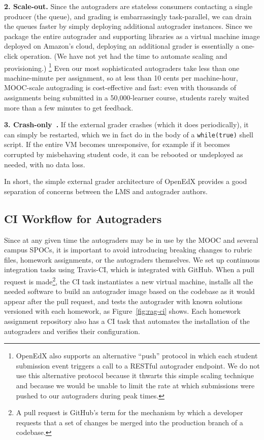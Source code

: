 \noindent\textbf{2. Scale-out.} 
Since the autograders are stateless consumers
contacting a single producer (the queue), and grading is
embarrassingly task-parallel, we can drain the queues faster by simply
deploying additional autograder instances.
Since we package the entire autograder and supporting libraries as a
virtual machine image deployed on Amazon's cloud, deploying an
additional grader is essentially a one-click operation. (We have not
yet had the time to automate scaling and provisioning.)
\footnote{OpenEdX also supports an alternative ``push'' protocol in which each student
submission event triggers a call to a RESTful autograder endpoint.
We do not use this
alternative protocol because it thwarts this simple scaling technique
and because we would be  unable to limit the rate at which
submissions were pushed to our autograders during peak times.}
Even our most sophisticated autograders take less than one
machine-minute per assignment, so at less than 10 cents per machine-hour,
MOOC-scale 
autograding is cost-effective and fast: even with
thousands of assignments being submitted in a 50,000-learner course,
students rarely waited more than a few minutes to get feedback.

\noindent\textbf{3. Crash-only~\cite{candea:crash-only}.}
If the external grader crashes (which it does periodically), it can
simply be restarted, which we in fact do in the
body of a \texttt{while(true)} shell script.
If the entire VM becomes unresponsive, for example if it becomes
corrupted by misbehaving student code, it can be rebooted or
undeployed as needed, with no data loss.

In short, the simple external grader architecture of OpenEdX provides a
good separation 
of concerns between the LMS and autograder authors.

\subsection{CI Workflow for Autograders}

Since at any given time the autograders
may be in use by the MOOC and several campus SPOCs, it is important to 
avoid introducing breaking changes to rubric files, homework
assignments, or the autograders themselves.
We set up continuous
integration tasks using Travis-CI, which is integrated with GitHub.
When a pull request is made\footnote{A pull request is
  GitHub's term for the mechanism by which a developer requests that a
  set of changes 
  be merged into the production branch of a codebase.},  
the CI task instantiates  a
new virtual 
machine, installs all the needed software to build an autograder image
based on the codebase as it would appear after the pull request,
and tests the autograder with known solutions versioned with each homework, as
Figure~\ref{fig:rag-ci} shows.
Each homework assignment repository also has a CI task that
automates the installation of the autograders and verifies their
configuration. 

